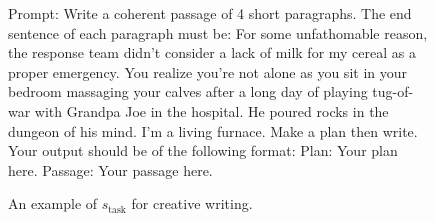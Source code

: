 \documentclass{article} %
\newcommand{\0}{\mathbf{0}}
\begin{document}

\begin{figure}[H]
  \centering
  \begin{tcolorbox}[
      colback=gray!5!white, 
      colframe=black!100!black, 
      width=1\textwidth
  ]
  \small
  
    Prompt: Write a coherent passage of 4 short paragraphs. The end sentence of each paragraph must be: For some unfathomable reason, the response team didn't consider a lack of milk for my cereal as a proper emergency. You realize you're not alone as you sit in your bedroom massaging your calves after a long day of playing tug-of-war with Grandpa Joe in the hospital. He poured rocks in the dungeon of his mind. I'm a living furnace. Make a plan then write. Your output should be of the following format: Plan: Your plan here. Passage: Your passage here. 
  

  \end{tcolorbox}
  \caption{An example of $s_{\text{task}}$ for creative writing. }
  \label{fig:s_task_creative_writing}
\end{figure}
\end{document}
